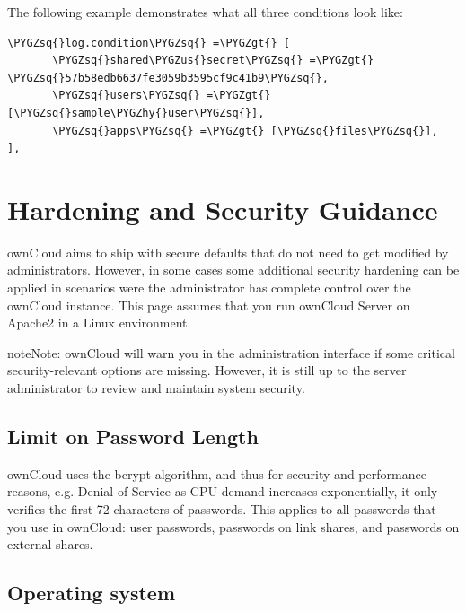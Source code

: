 \documentclass[letterpaper,10pt,english]{sphinxmanual}
\def\PYGZus{\char`\_}
\def\PYGZgt{\char`\>}
\def\PYGZhy{\char`\-}
\def\PYGZsq{\char`\'}
\renewcommand\PYGZsq{\textquotesingle}
\begin{document}
The following example demonstrates what all three conditions look like:

\begin{Verbatim}[commandchars=\\\{\}]
\PYGZsq{}log.condition\PYGZsq{} =\PYGZgt{} [
       \PYGZsq{}shared\PYGZus{}secret\PYGZsq{} =\PYGZgt{} \PYGZsq{}57b58edb6637fe3059b3595cf9c41b9\PYGZsq{},
       \PYGZsq{}users\PYGZsq{} =\PYGZgt{} [\PYGZsq{}sample\PYGZhy{}user\PYGZsq{}],
       \PYGZsq{}apps\PYGZsq{} =\PYGZgt{} [\PYGZsq{}files\PYGZsq{}],
],
\end{Verbatim}


\section{Hardening and Security Guidance}
\label{configuration_server/harden_server:php-date-function}\label{configuration_server/harden_server::doc}\label{configuration_server/harden_server:hardening-and-security-guidance}
ownCloud aims to ship with secure defaults that do not need to get modified by
administrators. However, in some cases some additional security hardening can be
applied in scenarios were the administrator has complete control over
the ownCloud instance. This page assumes that you run ownCloud Server on Apache2
in a Linux environment.

\begin{notice}{note}{Note:}
ownCloud will warn you in the administration interface if some
critical security-relevant options are missing. However, it is still up to
the server administrator to review and maintain system security.
\end{notice}


\subsection{Limit on Password Length}
\label{configuration_server/harden_server:limit-on-password-length}
ownCloud uses the bcrypt algorithm, and thus for security and performance
reasons, e.g. Denial of Service as CPU demand increases exponentially, it only
verifies the first 72 characters of passwords. This applies to all passwords
that you use in ownCloud: user passwords, passwords on link shares, and
passwords on external shares.


\subsection{Operating system}
\label{configuration_server/harden_server:operating-system}
\end{document}
